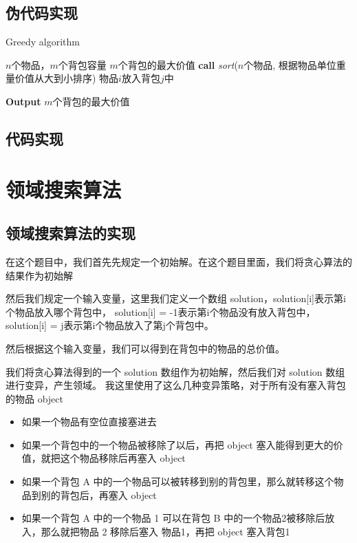 \documentclass[UTF8]{ctexart}
\begin{document}
\subsection{伪代码实现}
\begin{algorithm}
    \caption{Greedy algorithm}
    \label{alg3}
    \begin{algorithmic}[1]
        \REQUIRE $n$个物品，$m$个背包容量
        \ENSURE $m$个背包的最大价值
        \STATE \textbf{call} \textit{sort}($n$个物品, 根据物品单位重量价值从大到小排序)
        \STATE 物品$i$放入背包$j$中
        \ENDIF
        \ENDFOR
        \ENDFOR

        \STATE \textbf{Output} $m$个背包的最大价值
    \end{algorithmic}
\end{algorithm}

\subsection{代码实现}


\section{领域搜索算法}
\subsection{领域搜索算法的实现}
在这个题目中，我们首先先规定一个初始解。在这个题目里面，我们将贪心算法的结果作为初始解

然后我们规定一个输入变量，这里我们定义一个数组 solution，solution[i]表示第i个物品放入哪个背包中，
solution[i] = -1表示第i个物品没有放入背包中，solution[i] = j表示第i个物品放入了第j个背包中。

然后根据这个输入变量，我们可以得到在背包中的物品的总价值。

我们将贪心算法得到的一个 solution 数组作为初始解，然后我们对 solution 数组进行变异，产生领域。
我这里使用了这么几种变异策略，对于所有没有塞入背包的物品 object

\begin{itemize}
    \item 如果一个物品有空位直接塞进去
    \item 如果一个背包中的一个物品被移除了以后，再把 object 塞入能得到更大的价值，就把这个物品移除后再塞入 object
    \item 如果一个背包 A 中的一个物品可以被转移到别的背包里，那么就转移这个物品到别的背包后，再塞入 object
    \item 如果一个背包 A 中的一个物品 1 可以在背包 B 中的一个物品2被移除后放入，那么就把物品 2 移除后塞入 物品1，再把 object 塞入背包1
\end{itemize}
\end{document}
